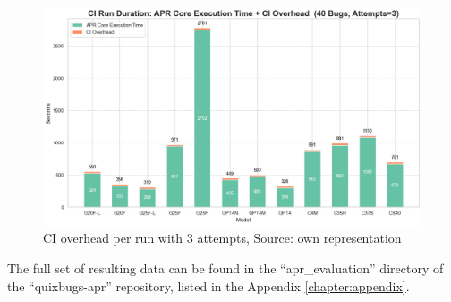 \begin{figure}[H]
    \centering
    \includegraphics[width=1\textwidth]{images/diagrams/ci_vs_exec_time_per_run_stacked_attempts_3.png}
    \caption{CI overhead per run with 3 attempts, Source: own representation}
    \label{fig:ci-vs-exec-time-per-run-attempts-3}
\end{figure}


The full set of resulting data can be found in the ``apr\_evaluation'' directory of the ``quixbugs-apr'' repository, listed in the Appendix \ref{chapter:appendix}.